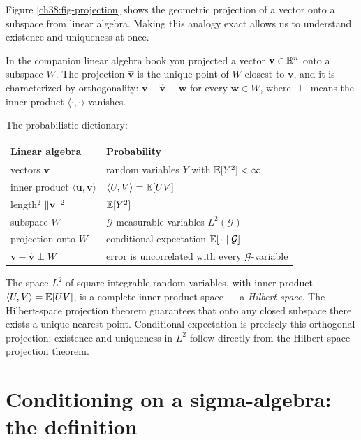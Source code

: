 Figure \ref{ch38:fig-projection} shows the geometric projection of a vector onto a
subspace from linear algebra. Making this analogy exact allows us to understand
existence and uniqueness at once.

\begin{connectionbox}
In the companion linear algebra book you projected a vector $\mathbf{v} \in \mathbb{R}^n$ onto a subspace
$W$. The projection $\hat{\mathbf{v}}$ is the unique point of $W$ closest to $\mathbf{v}$, and it is
characterized by orthogonality: $\mathbf{v} - \hat{\mathbf{v}} \perp \mathbf{w}$ for every
$\mathbf{w} \in W$, where $\perp$ means the inner product $\langle \cdot, \cdot \rangle$ vanishes.

The probabilistic dictionary:
\begin{center}
\begin{tabular}{ll}
\toprule
Linear algebra & Probability \\
\midrule
vectors $\mathbf{v}$ & random variables $Y$ with $\operatorname{\mathbb{E}}[Y^2] < \infty$ \\
inner product $\langle \mathbf{u},\mathbf{v}\rangle$ & $\langle U, V \rangle = \operatorname{\mathbb{E}}[UV]$ \\
length$^2$ $\lVert\mathbf{v}\rVert^2$ & $\operatorname{\mathbb{E}}[Y^2]$ \\
subspace $W$ & $\mathcal{G}$-measurable variables $L^2(\mathcal{G})$ \\
projection onto $W$ & conditional expectation $\operatorname{\mathbb{E}}[\,\cdot \mid \mathcal{G}]$ \\
$\mathbf{v}-\hat{\mathbf{v}} \perp W$ & error is uncorrelated with every $\mathcal{G}$-variable \\
\bottomrule
\end{tabular}
\end{center}
The space $L^2$ of square-integrable random variables, with inner product
$\langle U, V\rangle = \operatorname{\mathbb{E}}[UV]$, is a complete inner-product space --- a \emph{Hilbert space}.
The Hilbert-space projection theorem guarantees that onto any closed subspace there exists
a unique nearest point. Conditional expectation is precisely this orthogonal projection;
existence and uniqueness in $L^2$ follow directly from the Hilbert-space projection theorem.
\end{connectionbox}

\section{Conditioning on a sigma-algebra: the definition}
\label{ch38:definition}

